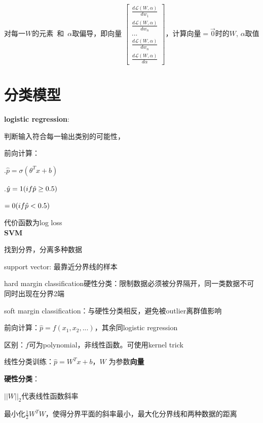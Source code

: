 \documentclass[UTF8]{ctexart}
\begin{document}
  \quad 对每一$W$的元素\ 和\ $\alpha$取偏导，即向量
  $\begin{bmatrix}
    \frac{d \mathcal{L}(W, \alpha)}{d w_1}  \\
    \frac{d \mathcal{L}(W, \alpha)}{d w_n} \\
    ... \\
    \frac{d \mathcal{L}(W, \alpha)}{d w_n} \\
    \frac{d \mathcal{L}(W, \alpha)}{d \alpha}
  \end{bmatrix}$，计算向量$=\vec{0} $时的$W$, $\alpha$取值




\section{分类模型}
\noindent \textbf{logistic regression}:

  判断输入符合每一输出类别的可能性，

  前向计算：
  
  .$\hat{p} = \sigma(\theta^Tx + b)$

  .$\hat{y} = 1\space (if \hat{p} \geq 0.5)$

  \quad \quad \quad $= 0\space (if \hat{p} < 0.5)$

  代价函数为log loss\\
\textbf{SVM}

  找到分界，分离多种数据

  support vector: 最靠近分界线的样本

  hard margin classification硬性分类：限制数据必须被分界隔开，同一类数据不可同时出现在分界2端

  soft margin classification：与硬性分类相反，避免被outlier离群值影响

  前向计算：$\hat{p} = f(x_1, x_2,...)$，其余同logistic regression

  \quad 区别：$f$可为polynomial，非线性函数。可使用kernel trick

  线性分类训练：$\hat{p} = W^Tx + b$，$W$ 为参数\textbf{向量}

  \quad \textbf{硬性分类}：

  \quad \quad $||W||_2$代表线性函数斜率

  \quad \quad 最小化$\frac{1}{2}W^TW$，使得分界平面的斜率最小，最大化分界线和两种数据的距离
\end{document}
